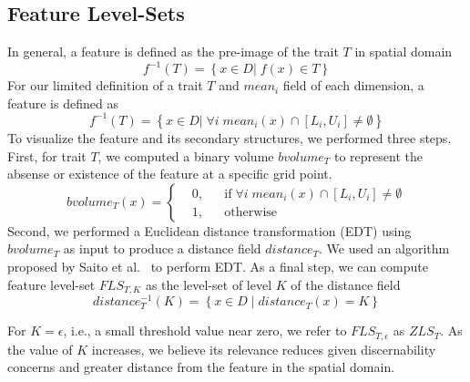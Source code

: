 \subsection{Feature Level-Sets}
In general, a feature is defined as the pre-image of the trait $T$ in spatial domain
\begin{equation}
f^{-1}(T) = \left\{ x \in D |\; f(x) \in T \right\}
\end{equation}
%
For our limited definition of a trait $T$ and $mean_{i}$ field of each dimension, a feature is defined as 
\begin{equation}
f^{-1}(T) = \left\{ x \in D |\; \forall i\;mean_{i}(x) \cap [L_{i}, U_{i}] \neq \emptyset\right\}
\end{equation}
To visualize the feature and its secondary structures, we performed three steps.
%
First, for trait $T$, we computed a binary volume $bvolume_{T}$ to represent the absense or existence of the feature at a specific grid point.
%
\begin{equation}
  bvolume_{T}(x) = \left \{
  \begin{aligned}
    &0, && \text{if}\; \forall i\; mean_{i}(x) \cap [L_{i}, U_{i}] \neq \emptyset \\
    &1, && \text{otherwise}
  \end{aligned} \right.
\end{equation}
%
Second, we performed a Euclidean distance transformation (EDT) using $bvolume_{T}$ as input to produce a distance field $distance_{T}$. 
%
We used an algorithm proposed by Saito et al.~\cite{saito1994new} to perform EDT.
%
As a final step, we can compute feature level-set $FLS_{T,K}$ as the level-set of level $K$ of the distance field
%
\begin{equation} 
distance_{T}^{-1}(K) = \left\{ x \in D\; |\; distance_{T}(x) = K\right\}
\end{equation}

For $K = \epsilon$, i.e., a small threshold value near zero, we refer to $FLS_{T,\epsilon}$ as $ZLS_{T}$.
%
As the value of $K$ increases, we believe its relevance reduces given discernability concerns and greater distance from the feature in the spatial domain.
%

